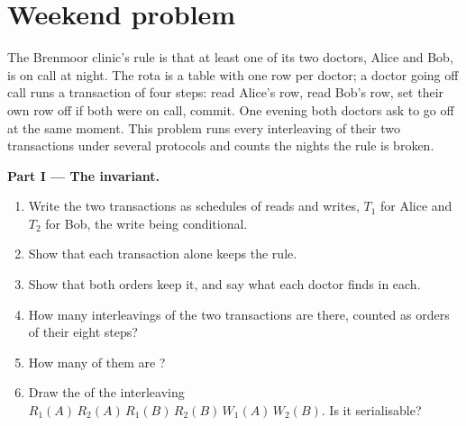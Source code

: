 \section{Weekend problem}\label{sec:b3:transactions-and-recovery:problem}

\begin{problem}\label{pb:b3:transactions-and-recovery:1}
The Brenmoor clinic's rule is that at least one of its two doctors, Alice and Bob, is on call at night. The rota is a table with one row per doctor; a doctor going off call runs a transaction of four steps: read Alice's row, read Bob's row, set their own row off if both were on call, commit. One evening both doctors ask to go off at the same moment. This problem runs every interleaving of their two transactions under several protocols and counts the nights the rule is broken.

\label{lst:b3:transactions-and-recovery:doctors}

\label{out:b3:transactions-and-recovery:doctors}

\medskip\noindent\textbf{Part I --- The invariant.}
\begin{enumerate}
  \item Write the two transactions as schedules of reads and writes, $T_1$ for Alice and $T_2$ for Bob, the write being conditional.
  \item Show that each transaction alone keeps the rule.
  \item Show that both  orders keep it, and say what each doctor finds in each.
  \item How many interleavings of the two transactions are there, counted as orders of their eight steps?
  \item How many of them are ?
  \item Draw the  of the interleaving $R_1(A)\,R_2(A)\,R_1(B)\,R_2(B)\,W_1(A)\,W_2(B)$. Is it serialisable?
\end{enumerate}


\end{problem}
